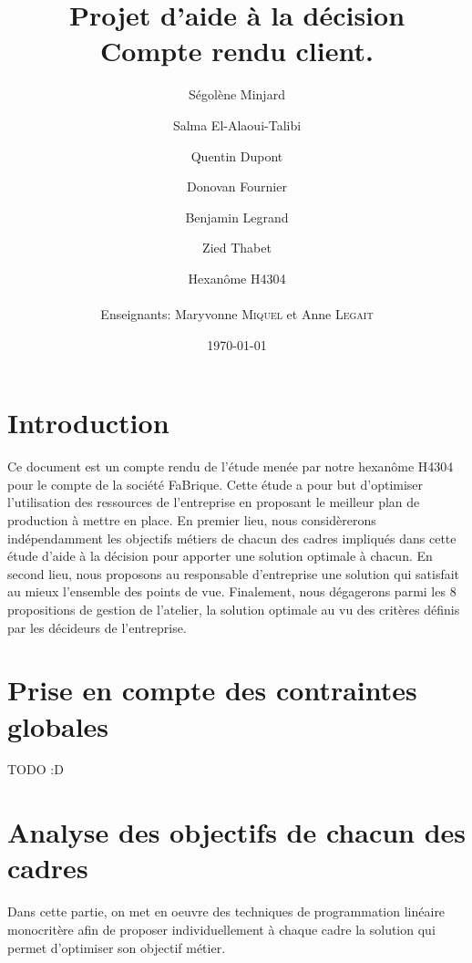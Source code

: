\documentclass[12pt]{article}
\title{Projet d'aide à la décision \\ Compte rendu client.}
\date{\today}
\author{Ségolène Minjard \and Salma El-Alaoui-Talibi \and Quentin Dupont \and Donovan Fournier \and Benjamin Legrand \and Zied Thabet \and Hexanôme H4304 \\ \\ Enseignants: Maryvonne \textsc{Miquel}
et Anne \textsc{Legait}  }
\begin{document}
\maketitle

\vspace{25pt}
\setcounter{tocdepth}{2}
\tableofcontents %
\pagebreak

\section{Introduction}
Ce document est un compte rendu de l'étude menée par notre hexanôme H4304 pour le compte de la société FaBrique. Cette étude a pour but d'optimiser l'utilisation des ressources de l'entreprise en proposant le meilleur plan de production à mettre en place. \newline
En premier lieu, nous considèrerons indépendamment les objectifs métiers de chacun des cadres impliqués dans cette étude d'aide à la décision pour apporter une solution optimale à chacun.
En second lieu, nous proposons au responsable d'entreprise une solution qui satisfait au mieux l'ensemble des points de vue.
Finalement, nous dégagerons parmi les 8 propositions de gestion de l'atelier, la solution optimale au vu des critères définis par les décideurs de l'entreprise.    


\section{Prise en compte des contraintes globales}
TODO :D

\section{Analyse des objectifs de chacun des cadres}
Dans cette partie, on met en oeuvre des techniques de programmation linéaire monocritère afin de proposer individuellement à chaque cadre la solution qui permet d'optimiser son objectif métier.
\end{document}
